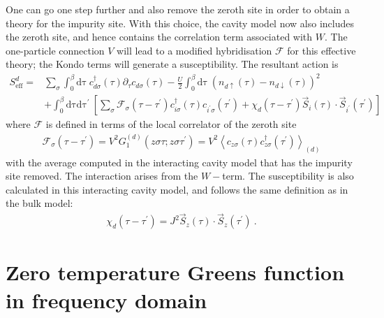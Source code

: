 \documentclass[reprint,hidelinks,onecolumn]{revtex4-2}
\begin{document}
One can go one step further and also remove the zeroth site in order to obtain a theory for the impurity site. With this choice, the cavity model now also includes the zeroth site, and hence contains the correlation term associated with \(W\). The one-particle connection \(V\) will lead to a modified hybridisation \(\mathcal{F}\) for this effective theory; the Kondo terms will generate a susceptibility. The resultant action is
\begin{equation}\begin{aligned}
	S^{d}_\text{eff} =& \sum_\sigma \int_0^\beta\mathrm{d\tau}~c^\dagger_{d\sigma}(\tau)\partial_\tau c_{d\sigma}(\tau) - \frac{U}{2}\int_0^\beta\mathrm{d\tau}~\left(n_{d\uparrow}(\tau) - n_{d\downarrow}(\tau)\right)^2 \\
			  &+ \int_0^\beta\mathrm{d\tau}\mathrm{d\tau^\prime}~\left[\sum_{\sigma}\mathcal{F}_{\sigma}(\tau - \tau^\prime)c^\dagger_{i\sigma}(\tau)c_{i^\prime\sigma}(\tau^\prime) + \chi_{d}(\tau - \tau^\prime)\vec{S}_{i}(\tau)\cdot\vec{S}_{i^\prime}(\tau^\prime)\right]
\end{aligned}\end{equation}
where \(\mathcal{F}\) is defined in terms of the local correlator of the zeroth site
\begin{equation}\begin{aligned}
	\mathcal{F}_\sigma(\tau - \tau^\prime) = V^2 G_1^{(d)}\left(z\sigma\tau; z\sigma\tau^\prime\right) = V^2 \left<c_{z\sigma}(\tau)c^\dagger_{z\sigma}(\tau^\prime)\right>_{(d)}
\end{aligned}\end{equation}
with the average computed in the interacting cavity model that has the impurity site removed. The interaction arises from the \(W-\)term. The susceptibility is also calculated in this interacting cavity model, and follows the same definition as in the bulk model:
\begin{equation}\begin{aligned}
	\chi_{d}(\tau - \tau^\prime) = J^2\vec{S}_{z}(\tau)\cdot\vec{S}_{z}(\tau^\prime)~.
\end{aligned}\end{equation}
\section{Zero temperature Greens function in frequency domain}

\label{appx-spectral-func}
\end{document}
